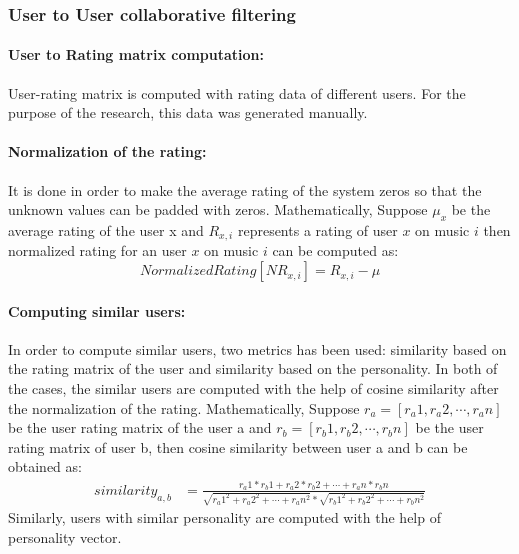 \documentclass[conference]{IEEEtran}
\begin{document}
\subsubsection{User to User collaborative filtering}

  \paragraph{User to Rating matrix computation:} User-rating matrix is computed with rating data of different users. For the purpose of the research, this data was generated manually.
  \paragraph{Normalization of the rating:} It is done in order to make the average rating of the system zeros so that the unknown values can be padded with zeros.
Mathematically,
Suppose $\mu_x$ be the average rating of the user x and $R_{x,i}$ represents a rating of user $x$ on music $i$ then normalized rating for an user $x$ on music $i$ can be computed as:
\begin{equation}\label{eq:normal}
  Normalized Rating[NR_{x,i}] = R_{x,i} - \mu
\end{equation}
\paragraph{Computing similar users:} In order to compute similar users, two metrics has been used: similarity based on the rating matrix of the user and similarity based on the personality. In both of the cases, the similar users are computed with the help of cosine similarity after the normalization of the rating.
Mathematically,
Suppose $r_a = [r_a1,r_a2,\cdots,r_an]$ be the user rating matrix of the user a and  $r_b = [r_b1,r_b2,\cdots,r_bn]$ be the user rating matrix of user b, then cosine similarity between user a and b can be obtained as:\\
\begin{equation}
\begin{aligned}

  similarity_{a,b} 
  & = \frac{r_a1*r_b1 + r_a2*r_b2 +\cdots+ r_an*r_bn}{\sqrt{{r_a1}^2+{r_a2}^2+\cdots+{r_an}^2} * \sqrt{{r_b1}^2+{r_b2}^2+\cdots+{r_bn}^2} }

\end{aligned}
\end{equation}
Similarly, users with similar personality are computed with the help of personality vector.\hfill
\end{document}
